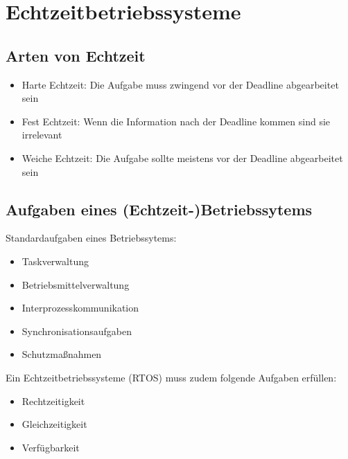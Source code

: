 \chapter{Echtzeitbetriebssysteme}
\section{Arten von Echtzeit}
\begin{itemize}
    \item Harte Echtzeit: Die Aufgabe muss zwingend vor der Deadline abgearbeitet sein
    \item Fest Echtzeit: Wenn die Information nach der Deadline kommen sind sie irrelevant
    \item Weiche Echtzeit: Die Aufgabe sollte meistens vor der Deadline abgearbeitet sein
\end{itemize}

\section{Aufgaben eines (Echtzeit-)Betriebssytems}
Standardaufgaben eines Betriebssytems:
\begin{itemize}
    \item Taskverwaltung
    \item Betriebsmittelverwaltung
    \item Interprozesskommunikation
    \item Synchronisationsaufgaben
    \item Schutzmaßnahmen
\end{itemize}
Ein Echtzeitbetriebssysteme (RTOS) muss zudem folgende Aufgaben erfüllen:
\begin{itemize}
    \item Rechtzeitigkeit
    \item Gleichzeitigkeit
    \item Verfügbarkeit
\end{itemize}

